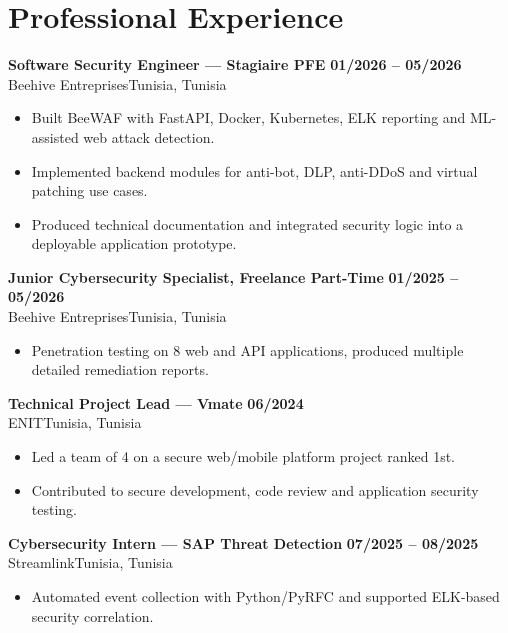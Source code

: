 \documentclass[a4paper,10pt]{article}
\newcommand{\cventry}[4]{\textbf{#1} \hfill \textbf{#4}\\[1pt]#2{\ifx\relax#3\relax\else, #3\fi}\par\vspace{2pt}}
\begin{document}
\section{Professional Experience}
\cventry{Software Security Engineer --- Stagiaire PFE}{Beehive Entreprises}{Tunisia}{01/2026 -- 05/2026}
\begin{itemize}
  \item Built BeeWAF with FastAPI, Docker, Kubernetes, ELK reporting and ML-assisted web attack detection.
  \item Implemented backend modules for anti-bot, DLP, anti-DDoS and virtual patching use cases.
  \item Produced technical documentation and integrated security logic into a deployable application prototype.
\end{itemize}
\cventry{Junior Cybersecurity Specialist, Freelance Part-Time}{Beehive Entreprises}{Tunisia}{01/2025 -- 05/2026}
\begin{itemize}
  \item Penetration testing on 8 web and API applications, produced multiple detailed remediation reports.
\end{itemize}
\cventry{Technical Project Lead — Vmate}{ENIT}{Tunisia}{06/2024}
\begin{itemize}
  \item Led a team of 4 on a secure web/mobile platform project ranked 1st.
  \item Contributed to secure development, code review and application security testing.
\end{itemize}
\cventry{Cybersecurity Intern — SAP Threat Detection}{Streamlink}{Tunisia}{07/2025 -- 08/2025}
\begin{itemize}
  \item Automated event collection with Python/PyRFC and supported ELK-based security correlation.
\end{itemize}
\end{document}
